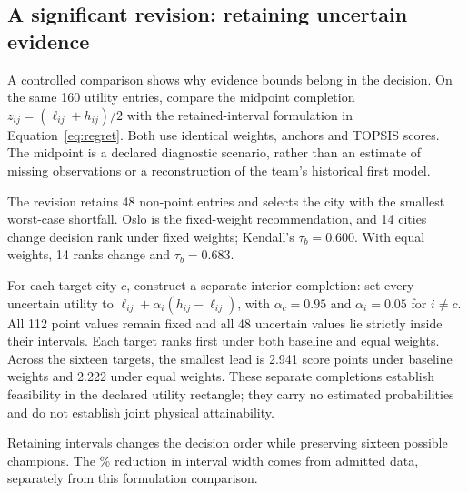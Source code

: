 \subsection{A significant revision: retaining uncertain evidence}
A controlled comparison shows why evidence bounds belong in the decision.
On the same 160 utility entries, compare the midpoint completion $z_{ij}=(\ell_{ij}+h_{ij})/2$ with the retained-interval formulation in Equation~\ref{eq:regret}. Both use identical weights, anchors and TOPSIS scores. The midpoint is a declared diagnostic scenario, rather than an estimate of missing observations or a reconstruction of the team's historical first model.

The revision retains 48 non-point entries and selects the city with the smallest worst-case shortfall. Oslo is the fixed-weight recommendation, and 14 cities change decision rank under fixed weights; Kendall's $\tau_b=0.600$. With equal weights, 14 ranks change and $\tau_b=0.683$.

For each target city $c$, construct a separate interior completion: set every uncertain utility to $\ell_{ij}+\alpha_i(h_{ij}-\ell_{ij})$, with $\alpha_c=0.95$ and $\alpha_i=0.05$ for $i\ne c$. All 112 point values remain fixed and all 48 uncertain values lie strictly inside their intervals. Each target ranks first under both baseline and equal weights. Across the sixteen targets, the smallest lead is 2.941 score points under baseline weights and 2.222 under equal weights. These separate completions establish feasibility in the declared utility rectangle; they carry no estimated probabilities and do not establish joint physical attainability.

Retaining intervals changes the decision order while preserving sixteen possible champions. The \TotalWidthReduction\% reduction in interval width comes from admitted data, separately from this formulation comparison.
